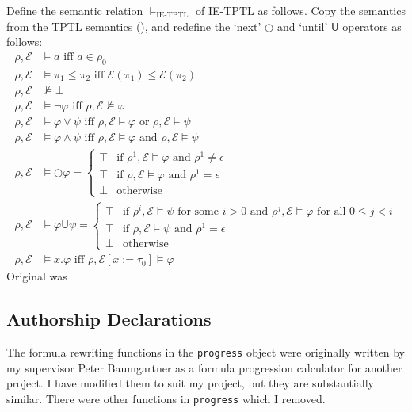 \documentclass[a4paper]{article}
\newcommand{\U}{\mathsf{U}}
\newcommand{\tand}{\text{ and }}
\newcommand{\tor}{\text{ or }}
\newcommand{\tiff}{\text{ iff }}
\newcommand{\fsome}{\text{ for some }}
\newcommand{\fall}{\text{ for all }}
\newcommand{\eval}{\mathcal{E}}
\begin{document}
\begin{defn}\label{ietptlsemfull}

  Define the semantic relation $\vDash_{\text{IE-TPTL}}$ of IE-TPTL as follows. Copy the semantics from the TPTL semantics (), and redefine the `next' $\bigcirc$ and `until' $\U$ operators as follows:
  \begin{align*}
    \rho,\eval&\vDash a \tiff a \in \rho_0\\
    \rho,\eval &\vDash \pi_1\leq\pi_2 \tiff \eval(\pi_1)\leq\eval(\pi_2)\\
    \rho,\eval&\nvDash \bot\\
    \rho,\eval&\vDash \neg \varphi \tiff \rho,\eval \nvDash \varphi\\
    \rho,\eval&\vDash \varphi \lor \psi \tiff \rho,\eval \vDash \varphi \tor \rho,\eval \vDash \psi\\
    \rho,\eval&\vDash \varphi \land \psi \tiff \rho,\eval \vDash \varphi \tand \rho,\eval \vDash \psi\\
    \rho,\eval&\vDash \bigcirc \varphi =
    \begin{cases}
      \top &\text{if } \rho^1,\eval \vDash \varphi \tand \rho^1 \ne \epsilon\\
      \top &\text{if } \rho,\eval\vDash \varphi \tand \rho^1 = \epsilon\\
      \bot &\text{otherwise}
    \end{cases}\\
    \rho,\eval&\vDash \varphi \U \psi =
    \begin{cases}
      \top &\text{if } \rho^i,\eval \vDash \psi \fsome i > 0 \tand \rho^j,\eval \vDash \varphi \fall 0 \leq j < i\\
      \top &\text{if } \rho,\eval\vDash \psi \tand \rho^1 = \epsilon\\
      \bot &\text{otherwise}
    \end{cases}\\
    \rho,\eval &\vDash x.\varphi \tiff \rho,\eval[x:=\tau_0]\vDash\varphi
      \end{align*}
  Original was 
\end{defn}



\newpage
\subsection{Authorship Declarations}
The formula rewriting functions in the \texttt{progress} object were originally written by my supervisor Peter Baumgartner as a formula progression calculator for another project. I have modified them to suit my project, but they are substantially similar. There were other functions in \texttt{progress} which I removed.
\end{document}
